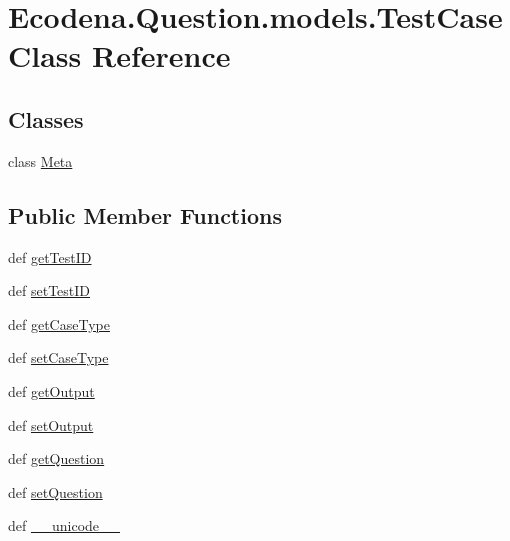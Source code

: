 \hypertarget{class_ecodena_1_1_question_1_1models_1_1_test_case}{
\section{Ecodena.Question.models.TestCase Class Reference}
\label{d4/d96/class_ecodena_1_1_question_1_1models_1_1_test_case}
}
\subsection*{Classes}
\begin{DoxyCompactItemize}
\item 
class \hyperlink{class_ecodena_1_1_question_1_1models_1_1_test_case_1_1_meta}{Meta}
\end{DoxyCompactItemize}
\subsection*{Public Member Functions}
\begin{DoxyCompactItemize}
\item 
def \hyperlink{class_ecodena_1_1_question_1_1models_1_1_test_case_a4fb48d15095cd0427bc10173e15108f1}{getTestID}
\item 
def \hyperlink{class_ecodena_1_1_question_1_1models_1_1_test_case_a4df892e6d36c107574b82e3937cb8deb}{setTestID}
\item 
def \hyperlink{class_ecodena_1_1_question_1_1models_1_1_test_case_ab452be1e08b66f59ec9297622e2518bd}{getCaseType}
\item 
def \hyperlink{class_ecodena_1_1_question_1_1models_1_1_test_case_a547f867e262925fde45a11d0c2783bb8}{setCaseType}
\item 
def \hyperlink{class_ecodena_1_1_question_1_1models_1_1_test_case_a05a4db473dc24424431db40ce7079957}{getOutput}
\item 
def \hyperlink{class_ecodena_1_1_question_1_1models_1_1_test_case_a6dba75c6d702caa4dc65e29f146af8ad}{setOutput}
\item 
def \hyperlink{class_ecodena_1_1_question_1_1models_1_1_test_case_a45b99c6e794a603432c104d9e20e9fff}{getQuestion}
\item 
def \hyperlink{class_ecodena_1_1_question_1_1models_1_1_test_case_a98562985754972ea95e1524d71bc9428}{setQuestion}
\item 
def \hyperlink{class_ecodena_1_1_question_1_1models_1_1_test_case_a6191eef780e0448362314de34699c67c}{\_\-\_\-unicode\_\-\_\-}
\end{DoxyCompactItemize}
